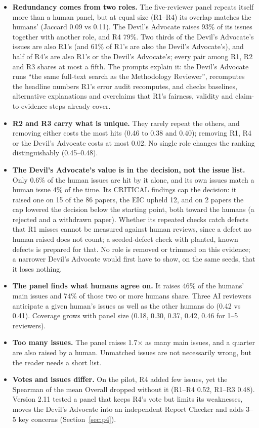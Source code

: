 \documentclass[11pt,a4paper]{article}
\begin{document}
\begin{itemize}
\item \textbf{Redundancy comes from two roles.} The five-reviewer panel repeats itself more than
a human panel, but at equal size (R1--R4) its overlap matches the humans' (Jaccard 0.09 vs 0.11).
The Devil's Advocate raises 93\% of its issues together with another role, and R4 79\%.
Two thirds of the Devil's Advocate's issues are also R1's (and 61\% of R1's are also the
Devil's Advocate's), and half of R4's are also R1's or the Devil's Advocate's; every pair among
R1, R2 and R3 shares at most a fifth. The prompts explain it: the Devil's Advocate runs ``the
same full-text search as the Methodology Reviewer'', recomputes the headline numbers R1's error
audit recomputes, and checks baselines, alternative explanations and overclaims that R1's
fairness, validity and claim-to-evidence steps already cover.
\item \textbf{R2 and R3 carry what is unique.} They rarely repeat the others, and removing either
costs the most hits (0.46 to 0.38 and 0.40); removing R1, R4 or the Devil's Advocate costs at most
0.02. No single role changes the ranking distinguishably (0.45--0.48).
\item \textbf{The Devil's Advocate's value is in the decision, not the issue list.} Only 0.6\%
of the human issues are hit by it alone, and its own issues match a human issue 4\% of the time.
Its CRITICAL findings cap the decision: it raised one on 15 of the 86 papers, the EIC upheld 12,
and on 2 papers the cap lowered the decision below the starting point, both toward the humans
(a rejected and a withdrawn paper). Whether its repeated checks catch defects that R1 misses
cannot be measured against human reviews, since a defect no human raised does not count; a
seeded-defect check with planted, known defects is prepared for that. No role is removed or
trimmed on this evidence; a narrower Devil's Advocate would first have to show, on the same
seeds, that it loses nothing.
\item \textbf{The panel finds what humans agree on.} It raises 46\% of the humans' main issues and
74\% of those two or more humans share. Three AI reviewers anticipate a given human's issues as
well as the other humans do (0.42 vs 0.41). Coverage grows with panel size (0.18, 0.30, 0.37,
0.42, 0.46 for 1--5 reviewers).
\item \textbf{Too many issues.} The panel raises 1.7$\times$ as many main issues, and a quarter
are also raised by a human. Unmatched issues are not necessarily wrong, but the reader needs a
short list.
\item \textbf{Votes and issues differ.} On the pilot, R4 added few issues, yet the Spearman of
the mean Overall dropped without it (R1--R4 0.52, R1--R3 0.48). Version 2.11 tested a panel
that keeps R4's vote but limits its weaknesses, moves the Devil's Advocate into an independent
Report Checker and adds 3--5 key concerns (Section~\ref{sec:p4}).
\end{itemize}
\end{document}
